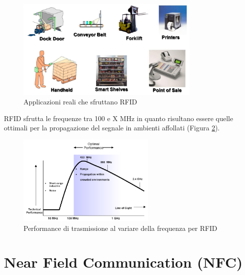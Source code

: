 	\begin{figure}[h]
		\centering
		\includegraphics[width=0.8\textwidth]{lez7/useCasesRFID.png}
		\caption{Applicazioni reali che sfruttano RFID}
		\label{fig:useCasesRFID}
	\end{figure}

	RFID sfrutta le frequenze tra 100 e X MHz in quanto risultano essere quelle ottimali per la propagazione del segnale in ambienti affollati (Figura \ref{fig:frequenzaOttimale}).
	
	\begin{figure}[h]
		\centering
		\includegraphics[width=0.6\textwidth]{lez7/optimalFrequency.png}
		\caption{Performance di trasmissione al variare della frequenza per RFID}
		\label{fig:frequenzaOttimale}
	\end{figure}


\section{Near Field Communication (NFC)}
